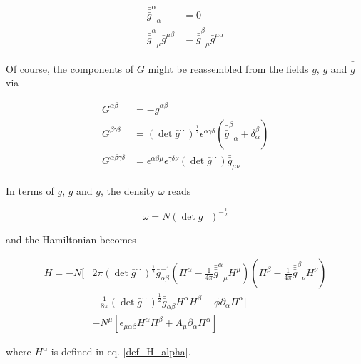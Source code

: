 \documentclass[11pt]{article}
\begin{document}
\begin{align}
	{\bar{\bar{\bar{g}}}^\alpha}_\alpha  &= 0 \\
	{\bar{\bar{\bar{g}}}^\alpha}_\mu \bar{g}^{\mu \beta} 
	&= {\bar{\bar{\bar{g}}}^\beta}_\mu \bar{g}^{\mu \alpha} 
\end{align}

Of course, the components of $G$ might be reassembled from the fields $\bar{g}$, $\bar{\bar{g}}$ and $\bar{\bar{\bar{g}}}$ via

\begin{align}
	G^{\alpha \beta} &= - \bar{g}^{\alpha \beta} \\
	G^{\beta \gamma \delta} 
	&= \left( \det{\bar{g}^{\cdot \cdot}} \right)^{\frac{1}{2}}
	\epsilon^{\alpha \gamma \delta} 
	\left( 
	{\bar{\bar{\bar{g}}}^\beta}_\alpha 
	+ \delta^\beta_\alpha 
	\right) \\
	G^{\alpha \beta \gamma \delta } &= 
	\epsilon^{\alpha \beta \mu} \epsilon^{\gamma \delta \nu}
	\left( \det{\bar{g}^{\cdot \cdot}} \right) 
	\bar{\bar{g}}_{\mu \nu}
\end{align}

In terms of $\bar{g}$, $\bar{\bar{g}}$ and $\bar{\bar{\bar{g}}}$, the density $\omega$ reads

\begin{equation}
	\omega = N \left( \det{\bar{g}^{\cdot \cdot}}\right)^{-\frac{1}{2}}
\end{equation}

and the Hamiltonian becomes

\begin{equation}
	\begin{split}
		H =
		- N [
		&2 \pi \left( \det{\bar{g}^{\cdot \cdot}}\right)^{\frac{1}{2}}
		\bar{g}^{-1}_{\alpha \beta} 
		\left( 
		\Pi^\alpha 
		- \frac{1}{4 \pi}  {\bar{\bar{\bar{g}}}^\alpha }_\mu H^\mu
		\right)
		\left( 
		\Pi^\beta
		- \frac{1}{4 \pi}  {\bar{\bar{\bar{g}}}^\beta }_\nu H^\nu
		\right) \\
		&- \frac{1}{8 \pi} 
		\left( \det{\bar{g}^{\cdot \cdot}}\right)^{\frac{1}{2}}
		\bar{\bar{g}}_{\alpha \beta} H^\alpha H^\beta 
		- \phi \partial_\alpha \Pi^\alpha
		]\\
		&- N^\mu \left[ 
		\epsilon_{\mu \alpha \beta} H^\alpha \Pi^\beta + A_\mu \partial_\alpha \Pi^\alpha
		\right]
	\end{split}
\end{equation}

where $H^\alpha$ is defined in eq. \ref{def_H_alpha}.
\end{document}
